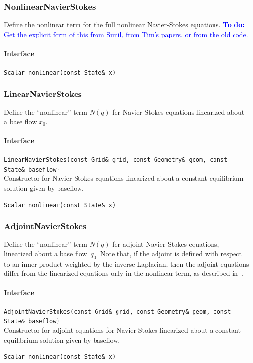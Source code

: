 \documentclass[11pt]{article}
\def\todo#1{\textcolor{blue}{{\bf To do:} #1}}
\let\code\lstinline
\begin{document}
\subsubsection{NonlinearNavierStokes}
Define the nonlinear term for the full nonlinear Navier-Stokes equations.
\todo{Get the explicit form of this from Sunil, from Tim's papers, or from the old code.}
\paragraph{Interface}
\begin{description}
	\item \code|Scalar nonlinear(const State& x)|
\end{description}

\subsubsection{LinearNavierStokes}
Define the ``nonlinear'' term $N(q)$ for Navier-Stokes equations linearized about a base flow $x_0$.

\paragraph{Interface}
\begin{description}
	\item \code|LinearNavierStokes(const Grid& grid, const Geometry& geom, const State& baseflow)|\\
		Constructor for Navier-Stokes equations linearized about a constant equilibrium solution given by baseflow.
	\item \code|Scalar nonlinear(const State& x)|
\end{description}

\subsubsection{AdjointNavierStokes}
Define the ``nonlinear'' term $N(q)$ for adjoint Navier-Stokes equations, linearized about a base flow~$q_0$.  Note that, if the adjoint is defined with respect to an inner product weighted by the inverse Laplacian, then the adjoint equations differ from the linearized equations only in the nonlinear term, as described in~\cite{AhuRow-08}.

\paragraph{Interface}
\begin{description}
	\item \code|AdjointNavierStokes(const Grid& grid, const Geometry& geom, const State& baseflow)|\\
		Constructor for adjoint equations for Navier-Stokes linearized about a constant equilibrium solution given by baseflow.
	\item \code|Scalar nonlinear(const State& x)|
\end{description}
\end{document}
